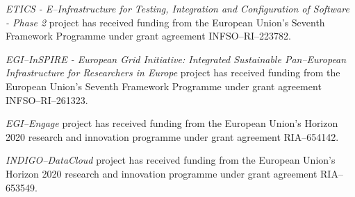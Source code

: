 \documentclass[journal]{IEEEtran}
\begin{document}
{\sl ETICS - E--Infrastructure for Testing, Integration and Configuration of Software - Phase 2}
project has received funding from the European Union's Seventh Framework Programme under grant
agreement INFSO--RI--223782.

{\sl EGI--InSPIRE - European Grid Initiative: Integrated Sustainable Pan--European
Infrastructure for Researchers in Europe} project has received funding from the European
Union's Seventh Framework Programme under grant agreement INFSO--RI--261323.

{\sl EGI--Engage} project has received funding from the European Union's Horizon 2020
research and innovation programme under grant agreement RIA--654142.

{\sl INDIGO--DataCloud} project has received funding from the European Union's Horizon
2020 research and innovation programme under grant agreement RIA--653549.
\end{document}
